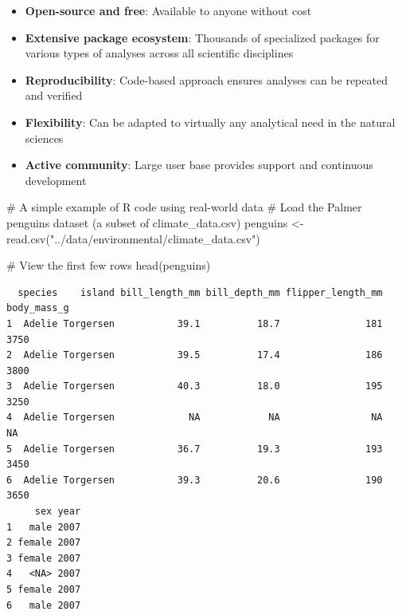 \documentclass[
  letterpaper,
]{book}
\newenvironment{Shaded}{\begin{snugshade}}{\end{snugshade}}
\newcommand{\CommentTok}[1]{\textcolor[rgb]{0.37,0.37,0.37}{#1}}
\newcommand{\FunctionTok}[1]{\textcolor[rgb]{0.28,0.35,0.67}{#1}}
\newcommand{\NormalTok}[1]{\textcolor[rgb]{0.00,0.23,0.31}{#1}}
\newcommand{\OtherTok}[1]{\textcolor[rgb]{0.00,0.23,0.31}{#1}}
\newcommand{\SpecialCharTok}[1]{\textcolor[rgb]{0.37,0.37,0.37}{#1}}
\newcommand{\StringTok}[1]{\textcolor[rgb]{0.13,0.47,0.30}{#1}}
\providecommand{\tightlist}{%
  \setlength{\itemsep}{0pt}\setlength{\parskip}{0pt}}
\begin{document}
\begin{itemize}
\tightlist
\item
  \textbf{Open-source and free}: Available to anyone without cost
\item
  \textbf{Extensive package ecosystem}: Thousands of specialized
  packages for various types of analyses across all scientific
  disciplines
\item
  \textbf{Reproducibility}: Code-based approach ensures analyses can be
  repeated and verified
\item
  \textbf{Flexibility}: Can be adapted to virtually any analytical need
  in the natural sciences
\item
  \textbf{Active community}: Large user base provides support and
  continuous development
\end{itemize}

\begin{Shaded}
\begin{Highlighting}[]
\CommentTok{\# A simple example of R code using real{-}world data}
\CommentTok{\# Load the Palmer penguins dataset (a subset of climate\_data.csv)}
\NormalTok{penguins }\OtherTok{\textless{}{-}} \FunctionTok{read.csv}\NormalTok{(}\StringTok{"../data/environmental/climate\_data.csv"}\NormalTok{)}

\CommentTok{\# View the first few rows}
\FunctionTok{head}\NormalTok{(penguins)}
\end{Highlighting}
\end{Shaded}

\begin{verbatim}
  species    island bill_length_mm bill_depth_mm flipper_length_mm body_mass_g
1  Adelie Torgersen           39.1          18.7               181        3750
2  Adelie Torgersen           39.5          17.4               186        3800
3  Adelie Torgersen           40.3          18.0               195        3250
4  Adelie Torgersen             NA            NA                NA          NA
5  Adelie Torgersen           36.7          19.3               193        3450
6  Adelie Torgersen           39.3          20.6               190        3650
     sex year
1   male 2007
2 female 2007
3 female 2007
4   <NA> 2007
5 female 2007
6   male 2007
\end{verbatim}

\begin{Shaded}
\end{Shaded}
\end{document}
